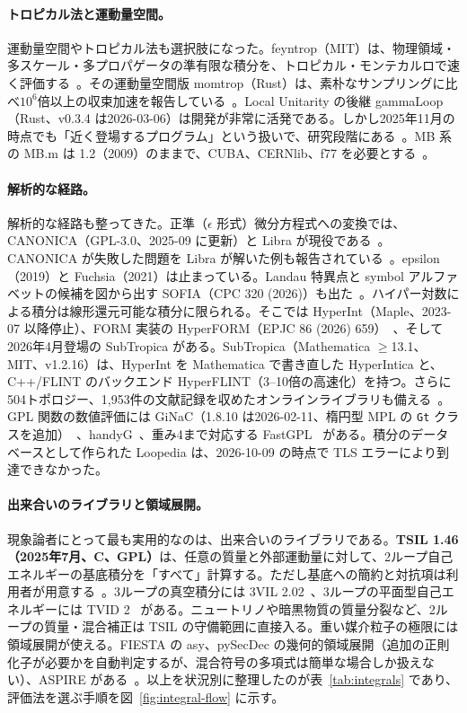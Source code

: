 \documentclass[a4paper,10pt]{ltjsarticle}
\begin{document}
\paragraph{トロピカル法と運動量空間。}運動量空間やトロピカル法も選択肢になった。feyntrop（MIT）は、物理領域・多スケール・多プロパゲータの準有限な積分を、トロピカル・モンテカルロで速く評価する~\cite{r103,r104}。その運動量空間版 momtrop（Rust）は、素朴なサンプリングに比べ$10^6$倍以上の収束加速を報告している~\cite{r105}。Local Unitarity の後継 gammaLoop（Rust、v0.3.4 は2026-03-06）は開発が非常に活発である。しかし2025年11月の時点でも「近く登場するプログラム」という扱いで、研究段階にある~\cite{r106,r107}。MB 系の MB.m は 1.2（2009）のままで、CUBA、CERNlib、f77 を必要とする~\cite{r108}。

\paragraph{解析的な経路。}解析的な経路も整ってきた。正準（$\epsilon$ 形式）微分方程式への変換では、CANONICA（GPL-3.0、2025-09 に更新）と Libra が現役である~\cite{r109,r110}。CANONICA が失敗した問題を Libra が解いた例も報告されている~\cite{r111}。epsilon（2019）と Fuchsia（2021）は止まっている。Landau 特異点と symbol アルファベットの候補を図から出す SOFIA（CPC 320 (2026)）も出た~\cite{r112}。ハイパー対数による積分は線形還元可能な積分に限られる。そこでは HyperInt（Maple、2023-07 以降停止）、FORM 実装の HyperFORM（EPJC 86 (2026) 659）~\cite{r113}、そして2026年4月登場の SubTropica がある。SubTropica（Mathematica $\geq$13.1、MIT、v1.2.16）は、HyperInt を Mathematica で書き直した HyperIntica と、C++/FLINT のバックエンド HyperFLINT（3--10倍の高速化）を持つ。さらに504トポロジー、1,953件の文献記録を収めたオンラインライブラリも備える~\cite{r114,r115}。GPL 関数の数値評価には GiNaC（1.8.10 は2026-02-11、楕円型 MPL の \texttt{Gt} クラスを追加）~\cite{r116}、handyG~\cite{r117}、重み4まで対応する FastGPL~\cite{r118} がある。積分のデータベースとして作られた Loopedia は、2026-10-09 の時点で TLS エラーにより到達できなかった。

\paragraph{出来合いのライブラリと領域展開。}現象論者にとって最も実用的なのは、出来合いのライブラリである。\textbf{TSIL 1.46（2025年7月、C、GPL）}は、任意の質量と外部運動量に対して、2ループ自己エネルギーの基底積分を「すべて」計算する。ただし基底への簡約と対抗項は利用者が用意する~\cite{r119}。3ループの真空積分には 3VIL 2.02~\cite{r120}、3ループの平面型自己エネルギーには TVID 2~\cite{r121} がある。ニュートリノや暗黒物質の質量分裂など、2ループの質量・混合補正は TSIL の守備範囲に直接入る。重い媒介粒子の極限には領域展開が使える。FIESTA の asy、pySecDec の幾何的領域展開（追加の正則化子が必要かを自動判定するが、混合符号の多項式は簡単な場合しか扱えない）、ASPIRE がある~\cite{r122,r123}。以上を状況別に整理したのが表~\ref{tab:integrals} であり、評価法を選ぶ手順を図~\ref{fig:integral-flow} に示す。
\end{document}
